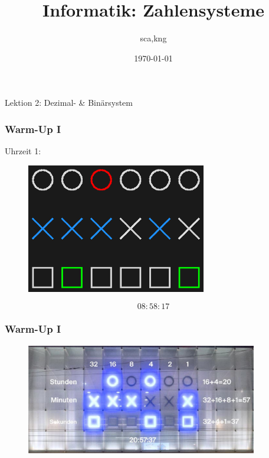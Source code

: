 \documentclass{beamer}
\title{Informatik: Zahlensysteme}
\author{sca,kng}
\institute{KSR}
\date{\today}
\begin{document}
\begin{frame}
    \titlepage
\end{frame}

\begin{frame}
    \LARGE
    Lektion 2: Dezimal- \& Binärsystem
\end{frame}

\begin{frame}
    \frametitle{Warm-Up I}
    Uhrzeit 1:
    \begin{figure}[H]
        \centering
        \includegraphics[width=0.7\textwidth]{08_58_17_dark}
    \end{figure}
     $$08:58:17$$
\end{frame}

\begin{frame}
    \frametitle{Warm-Up I}
    \begin{figure}[H]
        \centering
        \includegraphics[width=0.9\textwidth]{binary_clock_read_help}
    \end{figure}
\end{frame}
\end{document}

